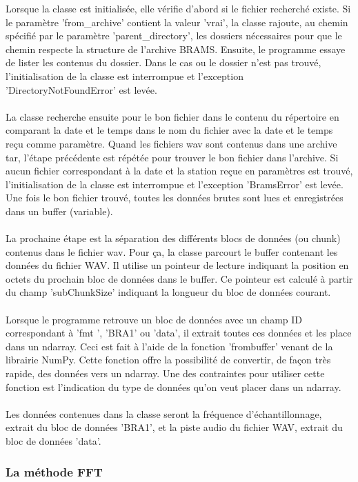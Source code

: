 \documentclass[11pt]{article}
\begin{document}
Lorsque la classe est initialisée, elle vérifie d'abord si le fichier recherché existe.
Si le paramètre 'from\_archive' contient la valeur 'vrai', la classe rajoute, au chemin spécifié par le paramètre 'parent\_directory', les dossiers nécessaires pour que le chemin respecte la structure de l'archive BRAMS.
Ensuite, le programme essaye de lister les contenus du dossier.
Dans le cas ou le dossier n'est pas trouvé, l'initialisation de la classe est interrompue et l'exception 'DirectoryNotFoundError' est levée.\\
\\
La classe recherche ensuite pour le bon fichier dans le contenu du répertoire en comparant la date et le temps dans le nom du fichier avec la date et le temps reçu comme paramètre.
Quand les fichiers wav sont contenus dans une archive tar, l'étape précédente est répétée pour trouver le bon fichier dans l'archive.
Si aucun fichier correspondant à la date et la station reçue en paramètres est trouvé, l'initialisation de la classe est interrompue et l'exception 'BramsError' est levée.
Une fois le bon fichier trouvé, toutes les données brutes sont lues et enregistrées dans un buffer (variable).\\
\\
La prochaine étape est la séparation des différents blocs de données (ou chunk) contenus dans le fichier wav.
Pour ça, la classe parcourt le buffer contenant les données du fichier WAV.
Il utilise un pointeur de lecture indiquant la position en octets du prochain bloc de données dans le buffer.
Ce pointeur est calculé à partir du champ 'subChunkSize' indiquant la longueur du bloc de données courant.\\
\\
Lorsque le programme retrouve un bloc de données avec un champ ID correspondant à 'fmt ', 'BRA1' ou 'data', il extrait toutes ces données et les place dans un ndarray.
Ceci est fait à l'aide de la fonction 'frombuffer' venant de la librairie NumPy.
Cette fonction offre la possibilité de convertir, de façon très rapide, des données vers un ndarray.
Une des contraintes pour utiliser cette fonction est l'indication du type de données qu'on veut placer dans un ndarray.\\
\\
Les données contenues dans la classe seront la fréquence d'échantillonnage, extrait du bloc de données 'BRA1', et la piste audio du fichier WAV, extrait du bloc de données 'data'.

\subsubsection{La méthode FFT}
\end{document}
